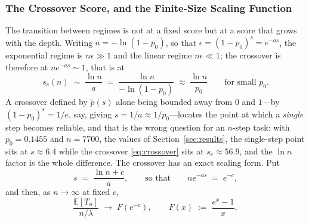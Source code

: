 \documentclass{article}
\begin{document}
\subsubsection{The Crossover Score, and the Finite-Size Scaling Function}
The transition between regimes is not at a fixed score but at a score that grows with the depth. Writing $a = -\ln(1-p_0)$, so that $\epsilon = (1-p_0)^s = e^{-as}$, the exponential regime is $n\epsilon \gg 1$ and the linear regime $n\epsilon \ll 1$; the crossover is therefore at $n e^{-a s} \sim 1$, that is at
\begin{equation}\label{eq:crossover}
s_c(n) \;\sim\; \frac{\ln n}{a} \;=\; \frac{\ln n}{-\ln(1-p_0)} \;\approx\; \frac{\ln n}{p_0} \qquad\text{for small } p_0.
\end{equation}
A crossover defined by $\widetilde{p}(s)$ alone being bounded away from $0$ and $1$---by $(1-p_0)^{s} = 1/e$, say, giving $s = 1/a \approx 1/p_0$---locates the point at which a \emph{single} step becomes reliable, and that is the wrong question for an $n$-step task: with $p_0 = 0.1455$ and $n = 7700$, the values of Section~\ref{sec:results}, the single-step point sits at $s \approx 6.4$ while the crossover \eqref{eq:crossover} sits at $s_c \approx 56.9$, and the $\ln n$ factor is the whole difference. The crossover has an exact scaling form. Put
\begin{equation}\label{eq:scaling-variable}
s \;=\; \frac{\ln n + c}{a}, \qquad\text{so that}\qquad n e^{-a s} \;=\; e^{-c},
\end{equation}
and then, as $n \to \infty$ at fixed $c$,
\begin{equation}\label{eq:scaling-function}
\frac{\mathbb{E}[T_n]}{n/\lambda} \;\longrightarrow\; F(e^{-c}), \qquad F(x) \;:=\; \frac{e^{x} - 1}{x},
\end{equation}
\end{document}

